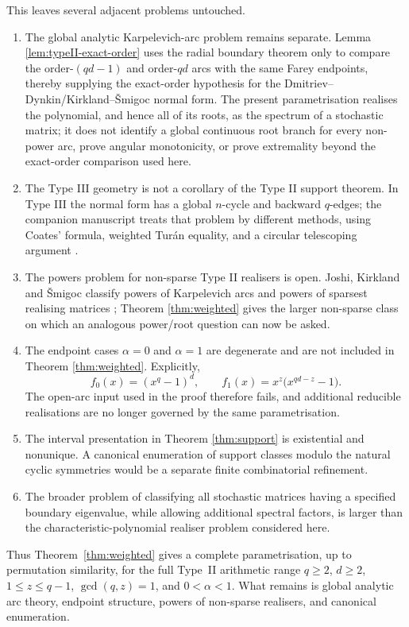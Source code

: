 \documentclass[11pt]{article}
\theoremstyle{definition}
\theoremstyle{remark}
\begin{document}
This leaves several adjacent problems untouched.
\begin{enumerate}[label=\textup{(\roman*)}]
\item The global analytic Karpelevich-arc problem remains separate. Lemma \ref{lem:typeII-exact-order} uses the radial boundary theorem only to compare the order-$(qd-1)$ and order-$qd$ arcs with the same Farey endpoints, thereby supplying the exact-order hypothesis for the Dmitriev--Dynkin/Kirkland--\v Smigoc normal form. The present parametrisation realises the polynomial, and hence all of its roots, as the spectrum of a stochastic matrix; it does not identify a global continuous root branch for every non-power arc, prove angular monotonicity, or prove extremality beyond the exact-order comparison used here.
\item The Type III geometry is not a corollary of the Type II support theorem. In Type III the normal form has a global $n$-cycle and backward $q$-edges; the companion manuscript treats that problem by different methods, using Coates' formula, weighted Tur\'an equality, and a circular telescoping argument \cite{VerbekenGinisTypeIII}.
\item The powers problem for non-sparse Type II realisers is open.  Joshi, Kirkland and \v Smigoc classify powers of Karpelevich arcs and powers of sparsest realising matrices \cite{JoshiKirklandSmigoc2023}; Theorem \ref{thm:weighted} gives the larger non-sparse class on which an analogous power/root question can now be asked.
\item The endpoint cases $\alpha=0$ and $\alpha=1$ are degenerate and are not included in Theorem \ref{thm:weighted}. Explicitly,
\[
        f_0(x)=(x^q-1)^d,
        \qquad
        f_1(x)=x^z\bigl(x^{qd-z}-1\bigr).
\]
The open-arc input used in the proof therefore fails, and additional reducible realisations are no longer governed by the same parametrisation.
\item The interval presentation in Theorem \ref{thm:support} is existential and nonunique.  A canonical enumeration of support classes modulo the natural cyclic symmetries would be a separate finite combinatorial refinement.
\item The broader problem of classifying all stochastic matrices having a specified boundary eigenvalue, while allowing additional spectral factors, is larger than the characteristic-polynomial realiser problem considered here.
\end{enumerate}

Thus Theorem~\ref{thm:weighted} gives a complete parametrisation, up to permutation similarity, for the full Type~II arithmetic range $q\ge2$, $d\ge2$, $1\le z\le q-1$, $\gcd(q,z)=1$, and $0<\alpha<1$. What remains is global analytic arc theory, endpoint structure, powers of non-sparse realisers, and canonical enumeration.
\end{document}
